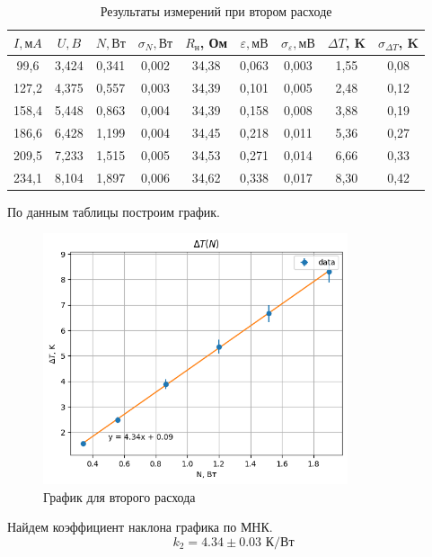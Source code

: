\documentclass[a4paper,12pt]{article}
\begin{document}
\begin{table}[H]
    \centering
    \begin{tabular}{|c|c|c|c|c|c|c|c|c|}
    \hline
        $I, мA$ & $U, B$ & $N, Вт$ & $\sigma_N, Вт$ & $R_н$, Ом  & $\varepsilon, мВ$ & $\sigma_{\varepsilon}, мВ$ & $\Delta T$, K & $\sigma_{\Delta T}$, K \\ \hline
        99,6 & 3,424 & 0,341 & 0,002 & 34,38 & 0,063 & 0,003 & 1,55 & 0,08 \\ \hline
        127,2 & 4,375 & 0,557 & 0,003 & 34,39 & 0,101 & 0,005 & 2,48 & 0,12 \\ \hline
        158,4 & 5,448 & 0,863 & 0,004 & 34,39 & 0,158 & 0,008 & 3,88 & 0,19 \\ \hline
        186,6 & 6,428 & 1,199 & 0,004 & 34,45 & 0,218 & 0,011 & 5,36 & 0,27 \\ \hline
        209,5 & 7,233 & 1,515 & 0,005 & 34,53 & 0,271 & 0,014 & 6,66 & 0,33 \\ \hline
        234,1 & 8,104 & 1,897 & 0,006 & 34,62 & 0,338 & 0,017 & 8,30 & 0,42 \\ \hline
    \end{tabular}
    \caption{Результаты измерений при втором расходе}
\end{table}

По данным таблицы построим график.

\begin{figure}[H]
	\begin{center}
    \includegraphics[width=0.8\textwidth]{second.png}
    \end{center}
    \caption{График для второго расхода}
\end{figure}

Найдем коэффициент наклона графика по МНК. 
\[ k_{2} = 4.34 \pm  0.03  \text{ К/Вт} \] 
\end{document}
